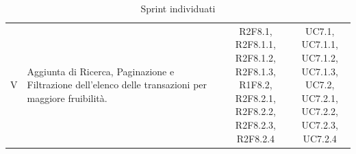 \begin{table}[H]
\begin{tabular}{c|p{6cm}|c|c}
    V   & Aggiunta di Ricerca, Paginazione e Filtrazione dell'elenco delle transazioni per maggiore fruibilità.                                         & \Shortunderstack{R2F8.1, R2F8.1.1,     \\R2F8.1.2, R2F8.1.3,\\R1F8.2, R2F8.2.1,\\R2F8.2.2, R2F8.2.3,\\R2F8.2.4\\} & \Shortunderstack{UC7.1, UC7.1.1,\\UC7.1.2, UC7.1.3,\\UC7.2, UC7.2.1,\\UC7.2.2, UC7.2.3,\\UC7.2.4\\} \\
  \end{tabular}
  \caption{Sprint individuati}
\end{table}
\pagebreak